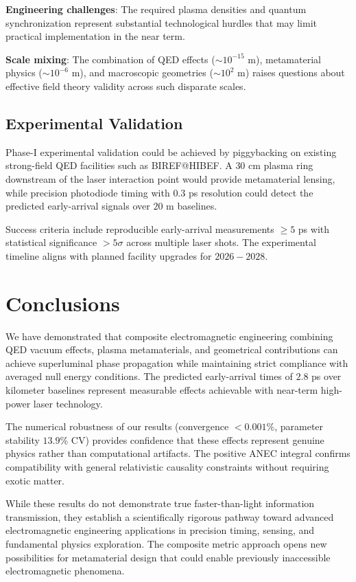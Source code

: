 \documentclass[aps,prl,reprint,groupedaddress]{revtex4-1}
\begin{document}
\textbf{Engineering challenges}: The required plasma densities and quantum synchronization represent substantial technological hurdles that may limit practical implementation in the near term.

\textbf{Scale mixing}: The combination of QED effects ($\sim 10^{-15}$ m), metamaterial physics ($\sim 10^{-6}$ m), and macroscopic geometries ($\sim 10^2$ m) raises questions about effective field theory validity across such disparate scales.

\subsection{Experimental Validation}

Phase-I experimental validation could be achieved by piggybacking on existing strong-field QED facilities such as BIREF@HIBEF. A $30$ cm plasma ring downstream of the laser interaction point would provide metamaterial lensing, while precision photodiode timing with $0.3$ ps resolution could detect the predicted early-arrival signals over $20$ m baselines.

Success criteria include reproducible early-arrival measurements $\geq 5$ ps with statistical significance $>5\sigma$ across multiple laser shots. The experimental timeline aligns with planned facility upgrades for $2026-2028$.

\section{Conclusions}

We have demonstrated that composite electromagnetic engineering combining QED vacuum effects, plasma metamaterials, and geometrical contributions can achieve superluminal phase propagation while maintaining strict compliance with averaged null energy conditions. The predicted early-arrival times of $2.8$ ps over kilometer baselines represent measurable effects achievable with near-term high-power laser technology.

The numerical robustness of our results (convergence $<0.001\%$, parameter stability $13.9\%$ CV) provides confidence that these effects represent genuine physics rather than computational artifacts. The positive ANEC integral confirms compatibility with general relativistic causality constraints without requiring exotic matter.

While these results do not demonstrate true faster-than-light information transmission, they establish a scientifically rigorous pathway toward advanced electromagnetic engineering applications in precision timing, sensing, and fundamental physics exploration. The composite metric approach opens new possibilities for metamaterial design that could enable previously inaccessible electromagnetic phenomena.
\end{document}
